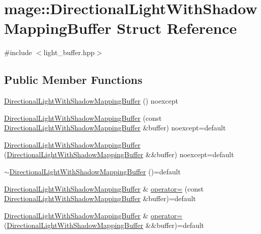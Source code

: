 \hypertarget{structmage_1_1_directional_light_with_shadow_mapping_buffer}{}\section{mage\+:\+:Directional\+Light\+With\+Shadow\+Mapping\+Buffer Struct Reference}
\label{structmage_1_1_directional_light_with_shadow_mapping_buffer}


{\ttfamily \#include $<$light\+\_\+buffer.\+hpp$>$}

\subsection*{Public Member Functions}
\begin{DoxyCompactItemize}
\item 
\hyperlink{structmage_1_1_directional_light_with_shadow_mapping_buffer_ab3ed4045cf1367f428843f925d1e0f1f}{Directional\+Light\+With\+Shadow\+Mapping\+Buffer} () noexcept
\item 
\hyperlink{structmage_1_1_directional_light_with_shadow_mapping_buffer_a8681c4ef469907846c12896d0e00eaaf}{Directional\+Light\+With\+Shadow\+Mapping\+Buffer} (const \hyperlink{structmage_1_1_directional_light_with_shadow_mapping_buffer}{Directional\+Light\+With\+Shadow\+Mapping\+Buffer} \&buffer) noexcept=default
\item 
\hyperlink{structmage_1_1_directional_light_with_shadow_mapping_buffer_a93570e94e1da3b02e0fc6aeeca3e2125}{Directional\+Light\+With\+Shadow\+Mapping\+Buffer} (\hyperlink{structmage_1_1_directional_light_with_shadow_mapping_buffer}{Directional\+Light\+With\+Shadow\+Mapping\+Buffer} \&\&buffer) noexcept=default
\item 
\hyperlink{structmage_1_1_directional_light_with_shadow_mapping_buffer_aaf69f9a370b547844fe51ccebc791876}{$\sim$\+Directional\+Light\+With\+Shadow\+Mapping\+Buffer} ()=default
\item 
\hyperlink{structmage_1_1_directional_light_with_shadow_mapping_buffer}{Directional\+Light\+With\+Shadow\+Mapping\+Buffer} \& \hyperlink{structmage_1_1_directional_light_with_shadow_mapping_buffer_a9a166d9ce2e74442b98e0d02bcbf18b8}{operator=} (const \hyperlink{structmage_1_1_directional_light_with_shadow_mapping_buffer}{Directional\+Light\+With\+Shadow\+Mapping\+Buffer} \&buffer)=default
\item 
\hyperlink{structmage_1_1_directional_light_with_shadow_mapping_buffer}{Directional\+Light\+With\+Shadow\+Mapping\+Buffer} \& \hyperlink{structmage_1_1_directional_light_with_shadow_mapping_buffer_a19765ecbd12d4f346269a22791d5347c}{operator=} (\hyperlink{structmage_1_1_directional_light_with_shadow_mapping_buffer}{Directional\+Light\+With\+Shadow\+Mapping\+Buffer} \&\&buffer)=default
\end{DoxyCompactItemize}
